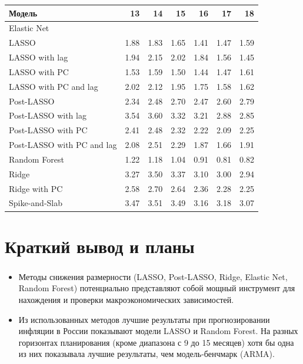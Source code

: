 \documentclass[c, dvipsnames]{beamer}  %
\begin{document}
 \begin{frame}
\begin{table}[ht]
\centering
\small
\begin{tabular}{lrrrrrr}
  \hline
Модель & 13 & 14 & 15 & 16 & 17 & 18 \\ 
  \hline
Elastic Net &  &  &  &  &  &  \\ 
  LASSO & 1.88 & 1.83 & 1.65 & 1.41 & 1.47 & 1.59 \\ 
  LASSO with lag & 1.94 & 2.15 & 2.02 & 1.84 & 1.56 & 1.45 \\ 
 LASSO with PC & 1.53 & 1.59 & 1.50 & 1.44 & 1.47 & 1.61 \\ 
 LASSO with PC and lag &2.02 & 2.12 & 1.95 & 1.75 & 1.58 & 1.62 \\ 
  Post-LASSO & 2.34 & 2.48 & 2.70 & 2.47 & 2.60 & 2.79 \\ 
 Post-LASSO with lag & 3.54 & 3.60 & 3.32 & 3.21 & 2.88 & 2.85 \\ 
  Post-LASSO with PC & 2.41 & 2.48 & 2.32 & 2.22 & 2.09 & 2.25 \\ 
  Post-LASSO with PC  and lag & 2.08 & 2.51 & 2.29 & 1.87 & 1.66 & 1.91 \\ 
  Random Forest & 1.22 & 1.18 & 1.04 & 0.91 & 0.81 & 0.82 \\ 
  Ridge & 3.27 & 3.50 & 3.37 & 3.10 & 3.00 & 2.94 \\ 
  Ridge with PC & 2.58 & 2.70 & 2.64 & 2.36 & 2.28 & 2.25 \\ 
  Spike-and-Slab & 3.47 & 3.51 & 3.49 & 3.16 & 3.18 & 3.07 \\  
   \hline
\end{tabular}
\end{table}
\end{frame}




\section{Краткий вывод и планы}
\begin{frame}
\frametitle{\insertsection} 
\begin{itemize}
    \item  Методы снижения размерности (LASSO, Post-LASSO, Ridge, Elastic Net, Random Forest) потенциально представляют собой мощный инструмент для нахождения и проверки макроэкономических зависимостей.
    \item Из использованных методов лучшие результаты при прогнозировании инфляции в России показывают модели LASSO и Random Forest. На разных горизонтах планирования  (кроме диапазона с 9 до 15 месяцев) хотя бы одна из них показывала лучшие результаты, чем модель-бенчмарк (ARMA).
\end{itemize}
   
    
\end{frame}
\end{document}
